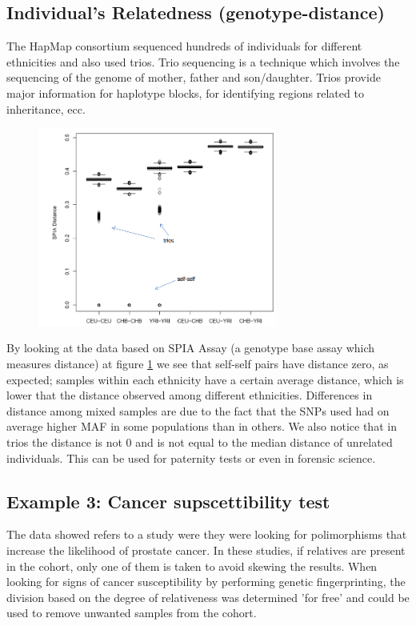 \subsection{Individual's Relatedness (genotype-distance)}

The HapMap consortium sequenced hundreds of individuals for different ethnicities and also used trios. Trio sequencing is a technique which involves the sequencing of the genome of mother, father and son/daughter. Trios provide major information for haplotype blocks, for identifying regions related to inheritance, ecc. 

\begin{figure}
	\centering
	\includegraphics[width = 0.7\textwidth]{relatedness.PNG}
	\caption{\label{fig: trios}}
\end{figure}

By looking at the data based on SPIA Assay (a genotype base assay which measures distance) at figure \ref*{fig: trios} we see that self-self pairs have distance zero, as expected; samples within each ethnicity have a certain average distance, which is lower that the distance observed among different ethnicities. Differences in distance among mixed samples are due to the fact that the SNPs used had on average higher MAF in some populations than in others. We also notice that in trios the distance is not 0 and is not equal to the median distance of unrelated individuals. This can be used for paternity tests or even in forensic science.

\subsection{Example 3: Cancer supscettibility test}
The data showed refers to a study were they were looking for polimorphisms that increase the likelihood of prostate cancer. In these studies, if relatives are present in the cohort, only one of them is taken to avoid skewing the results. 
When looking for signs of cancer susceptibility by performing genetic fingerprinting, the division based on the degree of relativeness was determined 'for free' and could be used to remove unwanted samples from the cohort.


